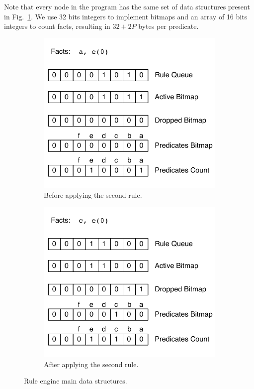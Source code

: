 Note that every node in the program has the same set of data structures present in Fig.~\ref{fig:rule_engine}.
We use 32 bits integers to implement bitmaps and an array of 16 bits integers to count facts, resulting in
$32 + 2P$ bytes per predicate.

\begin{figure}[h]
   \vspace{-\intextsep}
   \centering
   \begin{subfigure}[b]{0.45\textwidth}
      \includegraphics[width=\textwidth]{rule_queue1.pdf}
      \caption{Before applying the second rule.}
   \end{subfigure}
   \begin{subfigure}[b]{0.45\textwidth}
      \includegraphics[width=\textwidth]{rule_queue2.pdf}
      \caption{After applying the second rule.}
   \end{subfigure}
   \caption{Rule engine main data structures.}
   \label{fig:rule_engine}
   \vspace{-0.5\intextsep}
\end{figure}


